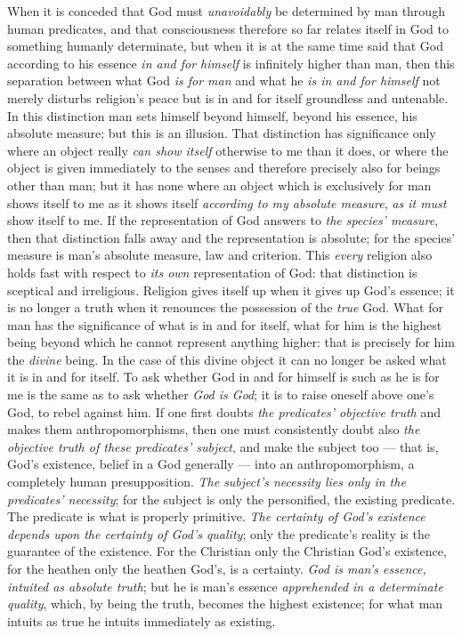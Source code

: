 \documentclass[12pt,a4paper]{book}
\begin{document}
When it is conceded that God must \emph{unavoidably} be determined by man
through human predicates, and that consciousness therefore so far relates
itself in God to something humanly determinate, but when it is at the same
time said that God according to his essence \emph{in and for himself} is
infinitely higher than man, then this separation between what God \emph{is for
man} and what he \emph{is in and for himself} not merely disturbs religion's
peace but is in and for itself groundless and untenable. In this distinction
man sets himself beyond himself, beyond his essence, his absolute measure; but
this is an illusion. That distinction has significance only where an object
really \emph{can show itself} otherwise to me than it does, or where the
object is given immediately to the senses and therefore precisely also for
beings other than man; but it has none where an object which is exclusively
for man shows itself to me as it shows itself \emph{according to my absolute
measure}, \emph{as it must} show itself to me. If the representation of God
answers to \emph{the species' measure}, then that distinction falls away and
the representation is absolute; for the species' measure is man's absolute
measure, law and criterion. This \emph{every} religion also holds fast with
respect to \emph{its own} representation of God: that distinction is sceptical
and irreligious. Religion gives itself up when it gives up God's essence; it
is no longer a truth when it renounces
the possession of the \emph{true} God. What for man has the significance of
what is in and for itself, what for him is the highest being beyond which he
cannot represent anything higher: that is precisely for him the
\emph{divine} being. In the case of this divine object it can no longer be
asked what it is in and for itself. To ask whether God in and for himself is
such as he is for me is the same as to ask whether \emph{God is God}; it is to
raise oneself above one's God, to rebel against him. If one first doubts
\emph{the predicates' objective truth} and makes them anthropomorphisms, then
one must consistently doubt also \emph{the objective truth of these
predicates' subject}, and make the subject too --- that is, God's existence,
belief in a God generally --- into an anthropomorphism, a completely human
presupposition. \emph{The subject's necessity lies only in the predicates'
necessity}; for the subject is only the personified, the existing predicate.
The predicate is what is properly primitive. \emph{The certainty of God's
existence depends upon the certainty of God's quality}; only the predicate's
reality is the guarantee of the existence. For the Christian only the
Christian God's existence, for the heathen only the heathen God's, is a
certainty. \emph{God is man's essence, intuited as absolute truth}; but he is
man's essence \emph{apprehended in a determinate quality}, which, by being the
truth, becomes the highest existence; for what man intuits as true he intuits
immediately as existing.
\end{document}
